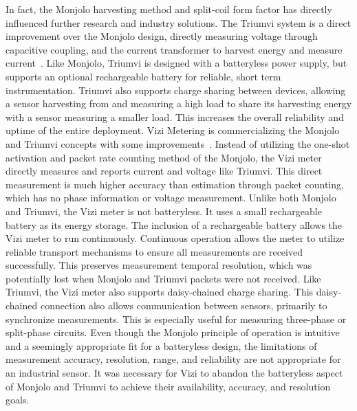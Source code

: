 In fact,
the Monjolo harvesting method and split-coil form factor has directly influenced further research and industry solutions.
The Triumvi system is a direct improvement over the Monjolo design, directly measuring voltage through capacitive coupling, and the current transformer to harvest energy and measure current~\cite{campbell2018energy}.
Like Monjolo, Triumvi is designed with a batteryless power supply, but supports an optional rechargeable battery for reliable, short term instrumentation.
Triumvi also supports charge sharing between devices,
allowing a sensor harvesting from and measuring a high load to share its harvesting energy with a sensor measuring a smaller load.
This increases the overall reliability and uptime of the entire deployment.
Vizi Metering is commercializing the Monjolo and Triumvi concepts with some improvements~\cite{vizimetering}.
Instead of utilizing the one-shot activation and packet rate counting method of the Monjolo, the Vizi meter directly measures and reports current and voltage like Triumvi. This direct measurement is much higher accuracy than estimation through packet counting, which has no phase information or voltage measurement.
Unlike both Monjolo and Triumvi, the Vizi meter is not batteryless. It uses a small rechargeable battery as its energy storage.
The inclusion of a rechargeable battery allows the Vizi meter to run continuously.
Continuous operation allows the meter to utilize reliable transport mechanisms to ensure all measurements are received successfully.
This preserves measurement temporal resolution, which was potentially lost when Monjolo and Triumvi packets were not received.
Like Triumvi, the Vizi meter also supports daisy-chained charge sharing.
This daisy-chained connection also allows communication between sensors, primarily to synchronize measurements. This is especially useful for measuring three-phase or split-phase circuits.
Even though the Monjolo principle of operation is intuitive and a seemingly appropriate fit for a batteryless design, the limitations of measurement accuracy, resolution, range, and reliability are not appropriate for an industrial sensor. It was necessary for Vizi to abandon the batteryless aspect of Monjolo and Triumvi to achieve their availability, accuracy, and resolution goals.

